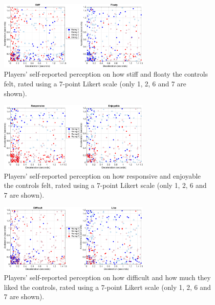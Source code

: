 \begin{figure}[htbp]
\centering
\includegraphics[width=0.67\textwidth]{Pics/Classes/Stiff_floaty}
\caption{Players' self-reported perception on how stiff and floaty the controls felt, rated using a 7-point Likert scale (only 1, 2, 6 and 7 are shown).}
\label{fig:stiff_floaty}
\end{figure}

\begin{figure}[htbp]
\centering
\includegraphics[width=0.67\textwidth]{Pics/Classes/Responsive_enjoyable}
\caption{Players' self-reported perception on how responsive and enjoyable the controls felt, rated using a 7-point Likert scale (only 1, 2, 6 and 7 are shown).}
\label{fig:responsive_enjoyable}
\end{figure}

\begin{figure}[htbp]
\centering
\includegraphics[width=0.67\textwidth]{Pics/Classes/difficult_like}
\caption{Players' self-reported perception on how difficult and how much they liked the controls, rated using a 7-point Likert scale (only 1, 2, 6 and 7 are shown).}
\label{fig:difficult_liked}
\end{figure}


